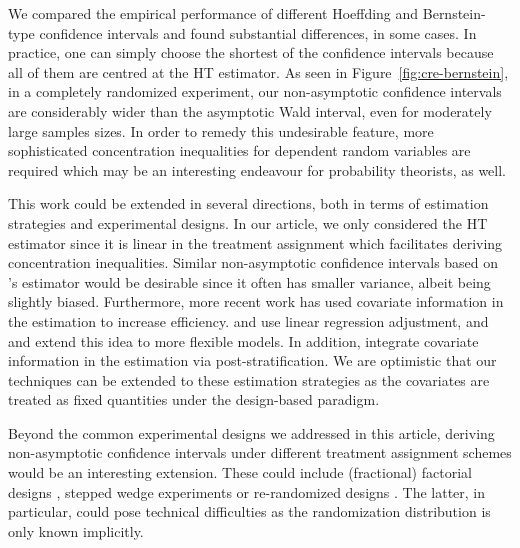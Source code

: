 \documentclass[aos]{imsart2}
\theoremstyle{plain}
\theoremstyle{definition}
\begin{document}
We compared the empirical performance of different Hoeffding and Bernstein-type confidence intervals and found substantial differences, in some cases. In practice, one can simply choose the shortest of the confidence intervals because all of them are centred at the HT estimator. As seen in Figure~\ref{fig:cre-bernstein}, in a completely randomized experiment, our non-asymptotic confidence intervals are considerably wider than the asymptotic Wald interval, even for moderately large samples sizes. In order to remedy this undesirable feature, more sophisticated concentration inequalities for dependent random variables are required which may be an interesting endeavour for probability theorists, as well.

This work could be extended in several directions, both in terms of estimation strategies and experimental designs. In our article, we only considered the HT estimator since it is linear in the treatment assignment which facilitates deriving concentration inequalities. Similar non-asymptotic confidence intervals based on \citet{hajek_1958,hajek_comment_1971}'s estimator would be desirable since it often has smaller variance, albeit being slightly biased. Furthermore, more recent work has used covariate information in the estimation to increase efficiency. \citet{freedman_regression_2008} and \citet{lin_agnostic_2013} use linear regression adjustment, and \citet{guo_generalized_2023} and \citet{cohen_no-harm_2024} extend this idea to more flexible models. In addition, \citet{miratrix_adjusting_2013} integrate covariate information in the estimation via post-stratification. We are optimistic that our techniques can be extended to these estimation strategies as the covariates are treated as fixed quantities under the design-based paradigm.

Beyond the common experimental designs we addressed in this article, deriving non-asymptotic confidence intervals under different treatment assignment schemes would be an interesting extension. These could include (fractional) factorial designs \citep{dasgupta_causal_2015, pashley_causal_2023}, stepped wedge experiments \citep{ji_randomization_2017} or re-randomized designs \citet{morgan_rerandomization_2012}. The latter, in particular, could pose technical difficulties as the randomization distribution is only known implicitly.
\end{document}
